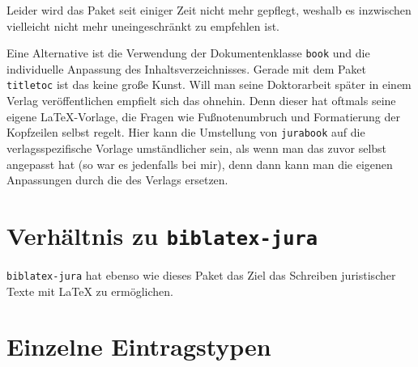 Leider wird das Paket seit einiger Zeit nicht mehr gepflegt, weshalb es inzwischen vielleicht nicht mehr uneingeschränkt zu empfehlen ist.

Eine Alternative ist die Verwendung der Dokumentenklasse \texttt{book} und die individuelle 
Anpassung des Inhaltsverzeichnisses. Gerade mit dem Paket \texttt{titletoc} ist das keine große 
Kunst. Will man seine Doktorarbeit später in einem Verlag veröffentlichen empfielt sich das ohnehin. 
Denn dieser hat oftmals seine eigene \LaTeX-Vorlage, die Fragen wie Fußnotenumbruch und 
Formatierung der Kopfzeilen selbst regelt. Hier kann die Umstellung von \texttt{jurabook} auf die 
verlagsspezifische Vorlage umständlicher sein, als wenn man das zuvor selbst angepasst hat (so war 
es jedenfalls bei mir), denn dann kann man die eigenen Anpassungen durch die des Verlags ersetzen.


\section{Verhältnis zu \texttt{biblatex-jura}}


\texttt{biblatex-jura} hat ebenso wie dieses Paket das Ziel das Schreiben juristischer Texte mit 
\LaTeX{} zu 
ermöglichen. 



\section{Einzelne Eintragstypen}



